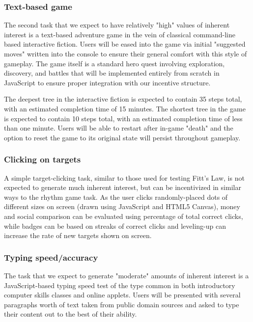 \subsubsection{Text-based game}
The second task that we expect to have relatively "high" values of inherent interest is a text-based adventure game in the vein of classical command-line based interactive fiction. Users will be eased into the game via initial "suggested moves" written into the console to ensure their general comfort with this style of gameplay. The game itself is a standard hero quest involving exploration, discovery, and battles that will be implemented entirely from scratch in JavaScript to ensure proper integration with our incentive structure.

The deepest tree in the interactive fiction is expected to contain 35 steps total, with an estimated completion time of 15 minutes. The shortest tree in the game is expected to contain 10 steps total, with an estimated completion time of less than one minute. Users will be able to restart after in-game "death" and the option to reset the game to its original state will persist throughout gameplay. 
\subsubsection{Clicking on targets} 
A simple target-clicking task, similar to those used for testing Fitt's Law, is not expected to generate much inherent interest, but can be incentivized in similar ways to the rhythm game task. As the user clicks randomly-placed dots of different sizes on screen (drawn using JavaScript and HTML5 Canvas), money and social comparison can be evaluated using percentage of total correct clicks, while badges can be based on streaks of correct clicks and leveling-up can increase the rate of new targets shown on screen.
 
\subsubsection{Typing speed/accuracy} 
The task that we expect to generate "moderate" amounts of inherent interest is a JavaScript-based typing speed test of the type common in both introductory computer skills classes and online applets. Users will be presented with several paragraphs worth of text taken from public domain sources and asked to type their content out to the best of their ability.
